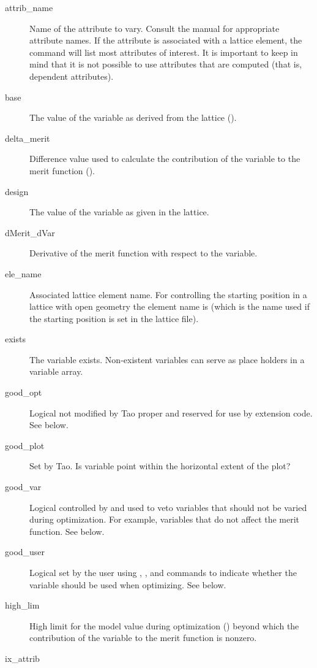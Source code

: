   \begin{description}
  \item[attrib_name] \Newline
Name of the attribute to vary. Consult the \bmad manual for appropriate attribute names. If the
attribute is associated with a lattice element, the  command will list most
attributes of interest.  It is important to keep in mind that it is not possible to use attributes
that are computed (that is, dependent attributes).
  \item[base] \Newline
The value of the variable as derived from the  lattice ().
  \item[delta_merit] \Newline
Difference value used to calculate the contribution of the variable to the merit function ().
  \item[design] \Newline
The value of the variable as given in the  lattice.
  \item[dMerit_dVar] \Newline
Derivative of the merit function with respect to the variable.
  \item[ele_name] \Newline
Associated lattice element name. For controlling the starting position in a lattice with open
geometry the element name is  (which is the name used if the starting position is
set in the lattice file). 
  \item[exists] \Newline
The variable exists. Non-existent variables can serve as place holders in a variable
array.
  \item[good_opt] \Newline
Logical not modified by Tao proper and reserved for use by extension code. See below.
  \item[good_plot] \Newline
Set by Tao. Is variable point within the horizontal extent of the plot? 
  \item[good_var] \Newline
Logical controlled by \tao and used to veto variables that should not be varied during
optimization. For example, variables that do not affect the merit function. See below.
  \item[good_user] \Newline
Logical set by the user using , , and  commands to indicate
whether the variable should be used when optimizing. See below.
  \item[high_lim] \Newline
High limit for the model value during optimization () beyond which
the contribution of the variable to the merit function is nonzero.
  \item[ix_attrib] \Newline

\end{description}
